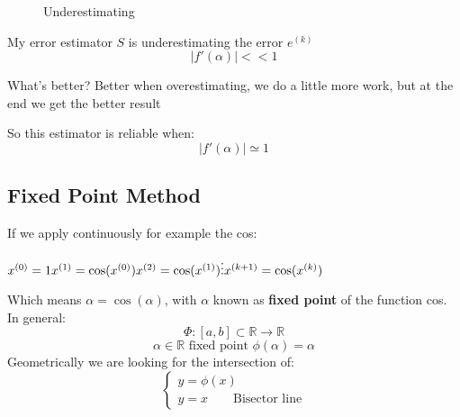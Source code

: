 \begin{figure}[!ht]
    \begin{minipage}{\linewidth}
        \centering
        \caption{Underestimating}
    \end{minipage}
\end{figure}
My error estimator $S$ is underestimating the error $e^{(k)}$
$$|f'(\alpha)| << 1$$

What's better? Better when overestimating, we do a little more work, but at the end we get the better result

So this estimator is reliable when:
$$|f'(\alpha)| \simeq 1$$

\subsection{Fixed Point Method}
If we apply continuously for example the cos:

$
x^{(0)}=1\\
x^{(1)}=\cos(x^{(0)})\\
x^{(2)}=\cos(x^{(1)})\\
\vdots\\
x^{(k+1)}=\cos(x^{(k)})
$

Which means $\alpha=\cos(\alpha)$, with $\alpha$ known as \textbf{fixed point} of the function cos. In general:
$$\Phi:[a,b]\subset\mathbb{R}\rightarrow \mathbb{R}$$
$$\alpha\in\mathbb{R}\text{ fixed point $\phi(\alpha)=\alpha$}$$
Geometrically we are looking for the intersection of:
$$
\begin{cases}
    y=\phi(x)\\
    y=x\qquad\text{Bisector line}
\end{cases}
$$

